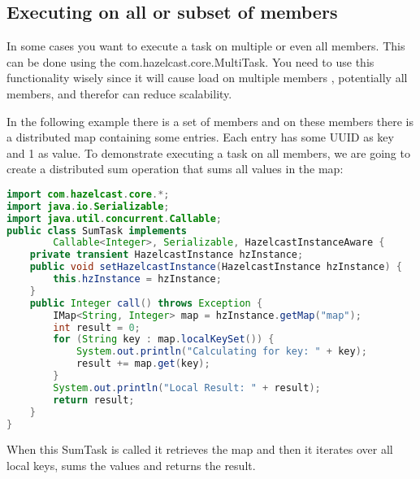 \subsection{Executing on all or subset of members}
In some cases you want to execute a task on multiple or even all members. This can be done using the com.hazelcast.core.MultiTask. You need to use this functionality wisely since it will cause load on multiple members , potentially all members, and therefor can reduce scalability.

In the following example there is a set of members and on these members there is a distributed map containing some entries. Each entry has some UUID as key and 1 as value. To demonstrate executing a task on all members, we are going to create a distributed sum operation that sums all values in the map:
\begin{lstlisting}[language=java]
import com.hazelcast.core.*;
import java.io.Serializable;
import java.util.concurrent.Callable;
public class SumTask implements
        Callable<Integer>, Serializable, HazelcastInstanceAware {
    private transient HazelcastInstance hzInstance;
    public void setHazelcastInstance(HazelcastInstance hzInstance) {
        this.hzInstance = hzInstance;
    }
    public Integer call() throws Exception {
        IMap<String, Integer> map = hzInstance.getMap("map");
        int result = 0;
        for (String key : map.localKeySet()) {
            System.out.println("Calculating for key: " + key);
            result += map.get(key);
        }
        System.out.println("Local Result: " + result);
        return result;
    }
}
\end{lstlisting}
When this SumTask is called it retrieves the map and then it iterates over all local keys, sums the values and returns the result.


